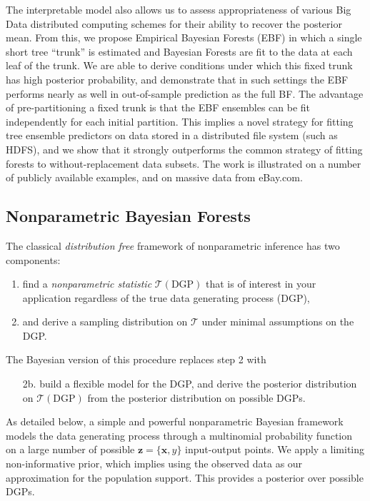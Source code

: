 \documentclass[12pt]{article}
\begin{document}
The interpretable model also allows us to assess appropriateness of
various Big Data distributed computing schemes for their ability to
recover the posterior mean. From this, we propose Empirical Bayesian
Forests (EBF) in which a single short tree ``trunk'' is estimated and
Bayesian Forests are fit to the data at each leaf of the trunk. We are
able to derive conditions under which this fixed trunk has high
posterior probability, and demonstrate that in such settings the EBF
performs nearly as well in out-of-sample prediction as the full BF. The
advantage of pre-partitioning a fixed trunk is that the EBF ensembles
can be fit independently for each initial partition. This implies a
novel strategy for fitting tree ensemble predictors on data stored in a
distributed file system (such as HDFS), and we show that it strongly
outperforms the common strategy of fitting forests to
without-replacement data subsets. The work is illustrated on a number of
publicly available examples, and on massive data from eBay.com.

    \subsection{Nonparametric Bayesian
Forests}\label{nonparametric-bayesian-forests}

The classical \emph{distribution free} framework of nonparametric
inference \cite{hollander_nonparametric_1999} has two components:
\begin{enumerate}
\item find a \emph{nonparametric statistic} $\mathcal{T}(\text{DGP})$ that is of interest in your application regardless of the true data generating process (DGP),
\item and derive a sampling distribution on $\mathcal{T}$ under minimal assumptions on the DGP.
\end{enumerate}
The Bayesian version of this procedure replaces step 2 with 
\begin{enumerate}
\item[2b.] build a flexible model for the DGP, and derive the posterior distribution on $\mathcal{T}(\text{DGP})$ from the posterior distribution on possible DGPs.
\end{enumerate}
As detailed below, a simple and powerful nonparametric Bayesian framework models the data generating process through a multinomial probability
function on a large number of possible $\mathbf{z} = \{\mathbf{x},y\}$ input-output points. We apply a limiting
non-informative prior, which implies using the observed data as our
approximation for the population support.  This provides a posterior over
possible DGPs.
\end{document}
